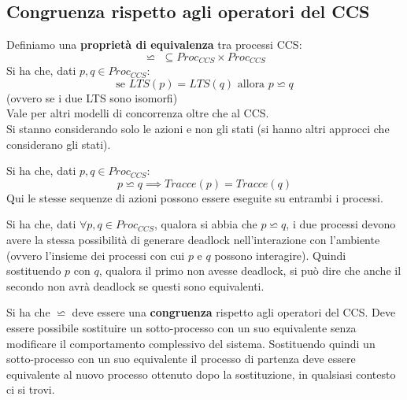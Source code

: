 \subsection{Congruenza rispetto agli operatori del CCS}
\begin{definizione}
  Definiamo una \textbf{proprietà di equivalenza} tra processi CCS:
  \[\backsimeq \,\,\subseteq  Proc_{CCS}\times  Proc_{CCS}\]
  Si ha che, dati $p, q\in Proc_{CCS}$:
  \[\mbox{se }LTS(p)=LTS(q)\mbox{ allora } p\backsimeq q\]
  (ovvero se i due LTS sono isomorfi)\\
  Vale per altri modelli di concorrenza oltre che al CCS.\\
  Si stanno considerando solo le azioni e non gli stati (si hanno altri approcci
  che considerano gli stati).
\end{definizione} \vspace{5mm} %
\begin{definizione}
  Si ha che, dati $p, q\in Proc_{CCS}$:
  \[p\backsimeq q\implies Tracce(p)=Tracce(q)\]
  Qui le stesse sequenze di azioni possono essere eseguite su entrambi i
  processi.  
\end{definizione} \vspace{5mm} %
\begin{definizione}
  Si ha che, dati $\forall p, q\in Proc_{CCS}$, qualora si abbia che $p\backsimeq
  q$, i due processi devono avere la stessa possibilità di generare deadlock
  nell'interazione con l'ambiente (ovvero l'insieme dei processi con cui $p$ e
  $q$ possono interagire). Quindi sostituendo $p$ con $q$, qualora il
  primo non avesse deadlock, si può dire che anche il secondo non avrà deadlock
  se questi sono equivalenti.
\end{definizione} \vspace{5mm} %
\begin{definizione}
  Si ha che $\backsimeq$ deve essere una \textbf{congruenza} rispetto agli
  operatori del CCS. Deve essere possibile sostituire un sotto-processo con un
  suo equivalente senza modificare il comportamento complessivo del
  sistema. Sostituendo quindi un sotto-processo con un suo equivalente il
  processo di partenza deve essere equivalente al nuovo processo ottenuto dopo
  la sostituzione, in qualsiasi contesto ci si trovi.
\end{definizione} \vspace{5mm} %
